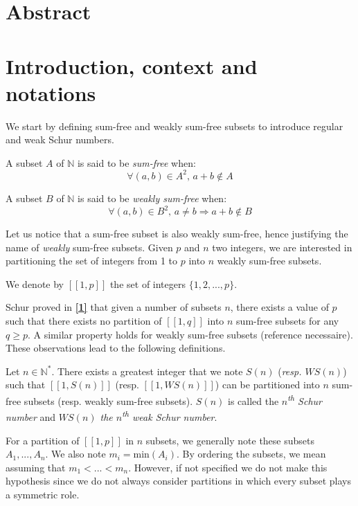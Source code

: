 \section{Abstract}



\section{Introduction, context and notations}

We start by defining sum-free and weakly sum-free subsets to introduce regular and weak Schur numbers.

\begin{definition}
A subset \(A\) of \(\mathbb{N}\) is said to be \textit{sum-free} when:
\[ \forall (a,b) \in A^2 \text{, } a+b \notin A\]
\end{definition}

\begin{definition}
A subset \(B\) of \(\mathbb{N}\) is said to be \textit{weakly sum-free} when:
\[ \forall (a,b) \in B^2 \text{, } a \neq b \Longrightarrow a+b \notin B\]
\end{definition}

Let us notice that a sum-free subset is also weakly sum-free, hence justifying the name of \textit{weakly} sum-free
subsets. Given \(p\) and \(n\) two integers, we are interested in partitioning the set of integers from 1 to \(p\) into
\(n\) weakly sum-free subsets.

\begin{notation}
We denote by \([\![1,p]\!]\) the set of integers \(\{1, 2, ..., p\}\).
\end{notation}

Schur proved in \hyperlink{label1}{\textbf{[1]}} that given a number of subsets \(n\), there exists a value of \(p\)
such that there exists no partition of \([\![1,q]\!]\) into \(n\) sum-free subsets for any \(q \geqslant p\). A similar
property holds for weakly sum-free subsets (reference necessaire). These observations lead to the following definitions.
\begin{definition}
Let \(n \in \mathbb{N}^*\). There exists a greatest integer that we note \(S(n)\) (\textit{resp. \(WS(n)\)}) such that
\([\![1,S(n)]\!]\) (resp. \([\![1,WS(n)]\!]\)) can be partitioned into \(n\) sum-free subsets (resp. weakly sum-free
subsets). \(S(n)\) is called the \textit{\(n\)\textsuperscript{th} Schur number} and \textit{\(WS(n)\) the
\(n\)\textsuperscript{th} weak
Schur number}.
\end{definition}

\begin{notation}
For a partition of \([\![1, p]\!]\) in \(n\) subsets, we generally note these subsets \(A_1, ..., A_n\). We also note
\(m_i = \text{min}(A_i)\).
By ordering the subsets, we mean assuming that \(m_1 < ... < m_n\). However, if not specified we do not make this
hypothesis since we
do not always consider partitions in which every subset plays a symmetric role.
\end{notation}